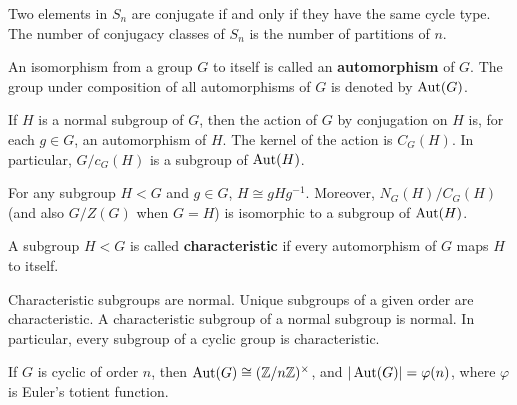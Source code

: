\begin{proposition} \cite[126]{DummitFoote2004} Two elements in $S_n$ are conjugate if and only if they have the same cycle type. The number of conjugacy classes of $S_n$ is the number of partitions of $n$.
\end{proposition}

\begin{definition} \cite[133]{DummitFoote2004} An isomorphism from a group $G$ to itself is called an \textbf{automorphism} of $G$. The group under composition of all automorphisms of $G$ is denoted by $\operatorname{Aut}(G)$.
\end{definition}

\begin{proposition} \cite[133]{DummitFoote2004} If $H$ is a normal subgroup of $G$, then the action of $G$ by conjugation on $H$ is, for each $g \in G$, an automorphism of $H$. The kernel of the action is $C_G(H)$. In particular, $G / c_G(H)$ is a subgroup of $\operatorname{Aut}(H)$.
\end{proposition}

\begin{corollary} \cite[134]{DummitFoote2004} For any subgroup $H < G$ and $g \in G$, $H \cong gHg^{-1}$. Moreover, $N_G(H) / C_G(H)$ (and also $G/Z(G)$ when $G = H$) is isomorphic to a subgroup of $\operatorname{Aut}(H)$.
\end{corollary}

\begin{definition} \cite[135]{DummitFoote2004} A subgroup $H < G$ is called \textbf{characteristic} if every automorphism of $G$ maps $H$ to itself.
\end{definition}

\begin{proposition} \cite[135]{DummitFoote2004} Characteristic subgroups are normal. Unique subgroups of a given order are characteristic. A characteristic subgroup of a normal subgroup is normal. In particular, every subgroup of a cyclic group is characteristic.
\end{proposition}

\begin{proposition} \cite[135]{DummitFoote2004} If $G$ is cyclic of order $n$, then $\operatorname{Aut}(G) \cong (\mathbb{Z} / n \mathbb{Z})^\times$, and $|\operatorname{Aut}(G)| = \varphi(n)$, where $\varphi$ is Euler's totient function.
\end{proposition}

